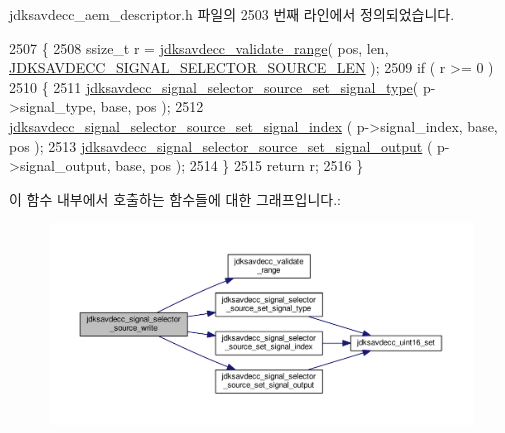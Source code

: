 jdksavdecc\+\_\+aem\+\_\+descriptor.\+h 파일의 2503 번째 라인에서 정의되었습니다.


\begin{DoxyCode}
2507 \{
2508     ssize\_t r = \hyperlink{group__util_ga9c02bdfe76c69163647c3196db7a73a1}{jdksavdecc\_validate\_range}( pos, len, 
      \hyperlink{group__signal__selector__source_ga70171d7a5ae8bc4f88d72d79f74d4c75}{JDKSAVDECC\_SIGNAL\_SELECTOR\_SOURCE\_LEN} );
2509     \textcolor{keywordflow}{if} ( r >= 0 )
2510     \{
2511         \hyperlink{group__signal__selector__source_ga74d79012e228c2fdd20d40ef592dc241}{jdksavdecc\_signal\_selector\_source\_set\_signal\_type}(
       p->signal\_type, base, pos );
2512         \hyperlink{group__signal__selector__source_ga742a026cfa04f5a53a930be332d14792}{jdksavdecc\_signal\_selector\_source\_set\_signal\_index}
      ( p->signal\_index, base, pos );
2513         \hyperlink{group__signal__selector__source_ga7ce44f1308fee173cc76701e4bc7db6d}{jdksavdecc\_signal\_selector\_source\_set\_signal\_output}
      ( p->signal\_output, base, pos );
2514     \}
2515     \textcolor{keywordflow}{return} r;
2516 \}
\end{DoxyCode}


이 함수 내부에서 호출하는 함수들에 대한 그래프입니다.\+:
\nopagebreak
\begin{figure}[H]
\begin{center}
\leavevmode
\includegraphics[width=350pt]{group__signal__selector__source_ga1a0eb5bd13f2749d9298e530b1886e3c_cgraph}
\end{center}
\end{figure}


